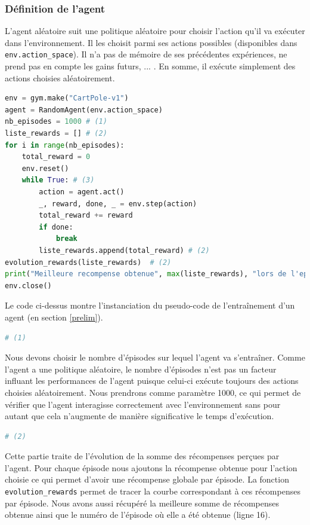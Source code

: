 \documentclass[10pt,a4paper]{article}
\begin{document}
\subsubsection{Définition de l'agent} \label{defAgentRand}
L'agent aléatoire suit une politique aléatoire pour choisir l'action qu'il va exécuter dans l'environnement. Il les choisit parmi ses actions possibles (disponibles dans \lstinline{env.action_space}). Il n'a pas de mémoire de ses précédentes expériences, ne prend pas en compte les gains futurs, ... . En somme, il exécute simplement des actions choisies aléatoirement.

\begin{lstlisting}[language=Python, caption=Programme principal de l'agent aléatoire]
env = gym.make("CartPole-v1")
agent = RandomAgent(env.action_space)
nb_episodes = 1000 # (1)
liste_rewards = [] # (2)
for i in range(nb_episodes): 
    total_reward = 0
    env.reset()
    while True: # (3)
        action = agent.act()
        _, reward, done, _ = env.step(action)
        total_reward += reward
        if done:
            break
        liste_rewards.append(total_reward) # (2)
evolution_rewards(liste_rewards)  # (2)
print("Meilleure recompense obtenue", max(liste_rewards), "lors de l'episode", liste_rewards.index(max(liste_rewards))) # (2)
env.close()

\end{lstlisting}

Le code ci-dessus montre l'instanciation du pseudo-code de l'entraînement d'un agent (en section \ref{prelim}).

\begin{lstlisting}[language=Python]
# (1)
\end{lstlisting}
Nous devons choisir le nombre d'épisodes sur lequel l'agent va s'entraîner. Comme l'agent a une politique aléatoire, le nombre d'épisodes n'est pas un facteur influant les performances de l'agent puisque celui-ci exécute toujours des actions choisies aléatoirement. Nous prendrons comme paramètre 1000, ce qui permet de vérifier que l'agent interagisse correctement avec l'environnement sans pour autant que cela n'augmente de manière significative le temps d'exécution.

\begin{lstlisting}[language=Python]
# (2)
\end{lstlisting}
Cette partie traite de l'évolution de la somme des récompenses perçues par l'agent. Pour chaque épisode nous ajoutons la récompense obtenue pour l'action choisie ce qui permet d'avoir une récompense \og globale \fg{}  par épisode. La fonction \lstinline{evolution_rewards} permet de tracer la courbe correspondant à ces récompenses par épisode. Nous avons aussi récupéré la meilleure somme de récompenses obtenue ainsi que le numéro de l'épisode où elle a été obtenue (ligne 16).
\end{document}
